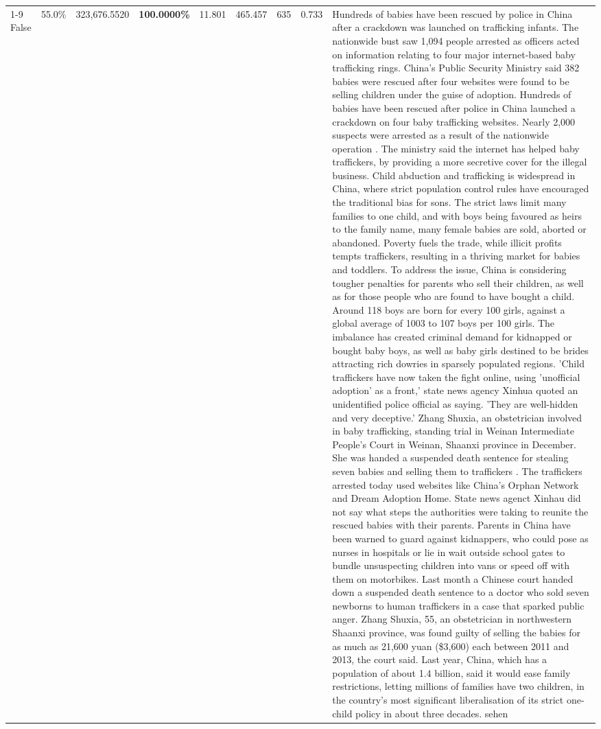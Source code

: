 \begin{table}[H]
\begin{tabular}{lllrlllll}
\cline{1-9}
False & 55.0\% & 323,676.5520 & \bfseries \color{red} 100.0000\% & 11.801 & 465.457 & 635 & 0.733 & Hundreds of babies have been rescued by police in China after a crackdown was launched on trafficking infants. The nationwide bust saw 1,094 people arrested as officers acted on information relating to four major internet-based baby trafficking rings. China's Public Security Ministry said 382 babies were rescued after four websites were found to be selling children under the guise of adoption. Hundreds of babies have been rescued after police in China launched a crackdown on four baby trafficking websites. Nearly 2,000 suspects were arrested as a result of the nationwide operation . The ministry said the internet has helped baby traffickers, by providing a more secretive cover for the illegal business. Child abduction and trafficking is widespread in China, where strict population control rules have encouraged the traditional bias for sons. The strict laws limit many families to one child, and with boys being favoured as heirs to the family name, many female babies are sold, aborted or abandoned. Poverty fuels the trade, while illicit profits tempts traffickers, resulting in a thriving market for babies and toddlers. To address the issue, China is considering tougher penalties for parents who sell their children, as well as for those people who are found to have bought a child. Around 118 boys are born for every 100 girls, against a global average of 1003 to 107 boys per 100 girls. The imbalance has created criminal demand for kidnapped or bought baby boys, as well as baby girls destined to be brides attracting rich dowries in sparsely populated regions. 'Child traffickers have now taken the fight online, using 'unofficial adoption' as a front,' state news agency Xinhua quoted an unidentified police official as saying. 'They are well-hidden and very deceptive.' Zhang Shuxia, an obstetrician involved in baby trafficking, standing trial in Weinan Intermediate People's Court in Weinan, Shaanxi province in December. She was handed a suspended death sentence for stealing seven babies and selling them to traffickers . The traffickers arrested today used websites like China's Orphan Network and Dream Adoption Home. State news agenct Xinhau did not say what steps the authorities were taking to reunite the rescued babies with their parents. Parents in China have been warned to guard against kidnappers, who could pose as nurses in hospitals or lie in wait outside school gates to bundle unsuspecting children into vans or speed off with them on motorbikes. Last month a Chinese court handed down a suspended death sentence to a doctor who sold seven newborns to human traffickers in a case that sparked public anger. Zhang Shuxia, 55, an obstetrician in northwestern Shaanxi province, was found guilty of selling the babies for as much as 21,600 yuan (\$3,600) each between 2011 and 2013, the court said. Last year, China, which has a population of about 1.4 billion, said it would ease family restrictions, letting millions of families have two children, in the country's most significant liberalisation of its strict one-child policy in about three decades. sehen \\

\end{tabular}
\end{table}
